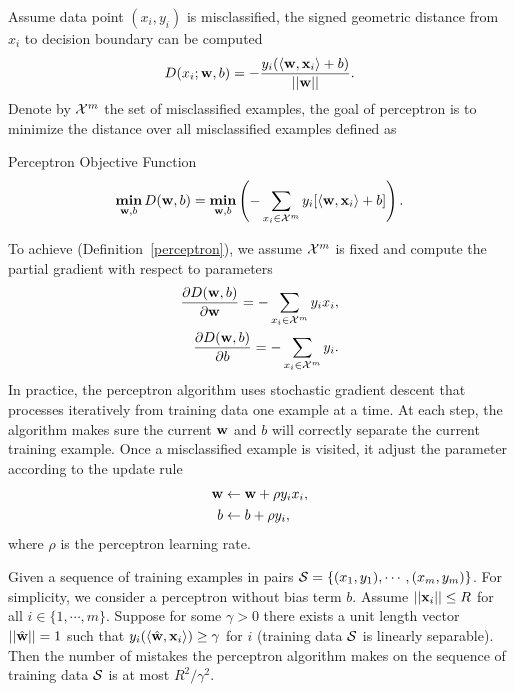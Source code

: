 {Assume data point $(x_i,y_i)$ is misclassified, the signed geometric distance from $x_i$ to decision boundary can be computed 
\begin{align*}
	D(x_i;\mathbf {w},b) = -\frac{y_i(\langle \mathbf {w}, \mathbf {x}_i \rangle+b)}{\left|\left| \mathbf {w} \right|\right|}.
\end{align*}
Denote by $\mathcal{X}^m$ the set of misclassified examples, the goal of perceptron is to minimize the distance over all misclassified examples defined as
\begin{definition}{Perceptron Objective Function}\label{perceptron}
	\begin{align*}
		\underset{\mathbf {w},b}{\textbf{min}} \, D(\mathbf {w},b) = \underset{\mathbf {w},b}{\textbf{min}} \left( -\sum_{x_i\in\mathcal{X}^{m}}y_i[\langle \mathbf {w}, \mathbf {x}_i \rangle+b]\right).
	\end{align*}
\end{definition}
To achieve (Definition~\ref{perceptron}), we assume $\mathcal{X}^{m}$ is fixed and compute the partial gradient with respect to parameters
\begin{align*}
	\frac{\partial D(\mathbf {w},b)}{\partial\mathbf {w}} = -\sum_{x_i\in\mathcal{X}^m}{y_ix_i},\\
	\frac{\partial D(\mathbf {w},b)}{\partial b} = -\sum_{x_i\in\mathcal{X}^m}{y_i}.
\end{align*}
In practice, the perceptron algorithm uses stochastic gradient descent that processes iteratively from training data one example at a time.
At each step, the algorithm makes sure the current $\mathbf {w}$ and $b$ will correctly separate the current training example. 
Once a misclassified example is visited, it adjust the parameter according to the update rule
\begin{align*}
	\mathbf {w} &\leftarrow \mathbf {w} + \rho y_i x_i,\\
	b &\leftarrow b + \rho y_i,
\end{align*}
where $\rho$ is the perceptron learning rate.
\begin{theory}\label{perceptron_theory}
	Given a sequence of training examples in pairs $\mathcal{S}=\{(x_1,y_1),\cdots,(x_m,y_m)\}$. 
	For simplicity, we consider a perceptron without bias term $b$.
	Assume $\left|\left| \mathbf {x}_i \right|\right|\le R$ for all $i\in\{1,\cdots,m\}$.
	Suppose for some $\gamma>0$ there exists a unit length vector $\left|\left| \hat{\mathbf {w}} \right|\right|=1$ such that $y_i(\langle \hat{\mathbf {w}}, \mathbf {x}_i \rangle)\ge\gamma$ for $i$ (training data $\mathcal{S}$ is linearly separable).
	Then the number of mistakes the perceptron algorithm makes on the sequence of training data $\mathcal{S}$ is at most ${R^2}/{\gamma^2}$.
\end{theory}
}
